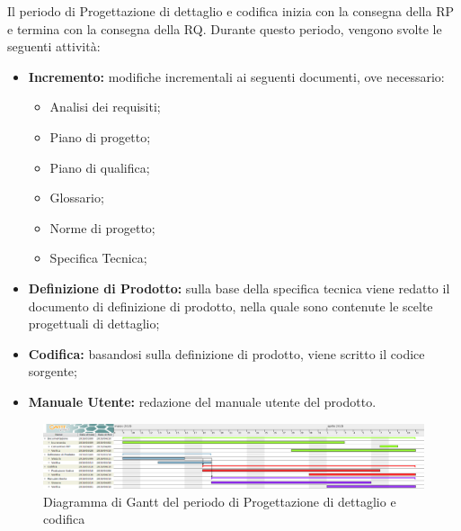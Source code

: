Il periodo di Progettazione di dettaglio e codifica inizia con la consegna della RP e termina con la consegna della RQ.\newline
Durante questo periodo, vengono svolte le seguenti attività:
\begin{itemize}
	\item \textbf{Incremento: }modifiche incrementali ai seguenti documenti, ove necessario:
	\begin{itemize}
		\item Analisi dei requisiti;
		\item Piano di progetto;
		\item Piano di qualifica;
		\item Glossario;
		\item Norme di progetto;
		\item Specifica Tecnica;
	\end{itemize}
	\item \textbf{Definizione di Prodotto: }sulla base della specifica tecnica viene redatto il documento di definizione di prodotto, nella quale sono contenute le scelte progettuali di dettaglio;
	\item \textbf{Codifica: }basandosi sulla definizione di prodotto, viene scritto il codice sorgente;
	\item \textbf{Manuale Utente: }redazione del manuale utente del prodotto. 
\end{itemize}


\begin{figure}[H]
	\includegraphics[width=1\linewidth]{Pianificazione/Progettazione_Dettaglio_Codififca.png}
	\caption{Diagramma di Gantt del periodo di Progettazione di dettaglio e codifica}
\end{figure}